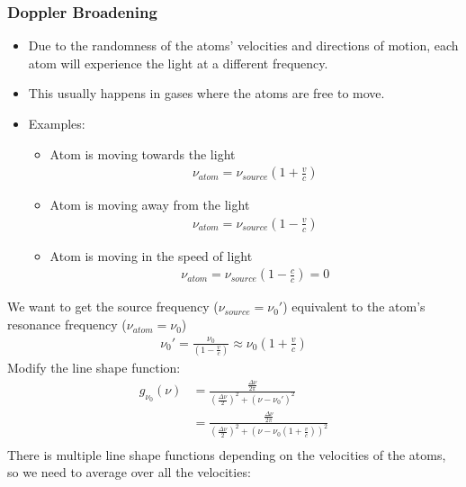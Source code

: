 \documentclass[11pt]{article}
\begin{document}
\subsubsection{Doppler Broadening}
\begin{itemize}
    \item Due to the randomness of the atoms' velocities and directions of motion, each atom will experience the light at a different frequency. 
    \item This usually happens in gases where the atoms are free to move.
    \item Examples:
        \begin{itemize}
            \item Atom is moving towards the light
                \begin{align*}
                    \nu_{atom} = \nu_{source} \left( 1 + \frac{v}{c} \right)
                \end{align*}
            \item Atom is moving away from the light
                \begin{align*}
                    \nu_{atom} = \nu_{source} \left( 1 - \frac{v}{c} \right)
                \end{align*}
            \item Atom is moving in the speed of light
                \begin{align*}
                    \nu_{atom} = \nu_{source} \left( 1 - \frac{c}{c} \right) = 0
                \end{align*}
        \end{itemize}
\end{itemize}
We want to get the source frequency ($\nu_{source} = \nu_0'$) equivalent to the atom's resonance frequency ($\nu_{atom} = \nu_0$)
\begin{align*}
    \nu_0' = \frac{\nu_0}{\left( 1 - \frac{v}{c} \right)} \approx \nu_0 \left( 1 + \frac{v}{c} \right)
\end{align*}
Modify the line shape function:
\begin{align*}
    g_{\nu_0}(\nu) &= \frac{\frac{\Delta \nu}{2 \pi}}{(\frac{\Delta \nu}{2})^2 + (\nu - \nu_0')^2} \\
    &= \frac{\frac{\Delta \nu}{2 \pi}}{(\frac{\Delta \nu}{2})^2 + (\nu - \nu_0(1 + \frac{v}{c}))^2} \\
\end{align*}
There is multiple line shape functions depending on the velocities of the atoms, so we need to average over all the velocities:
\end{document}
